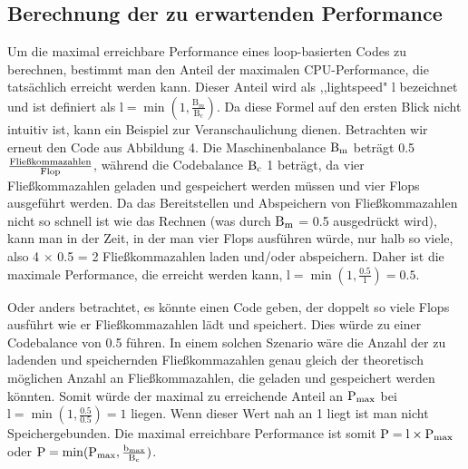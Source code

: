 \documentclass[sigconf,language=english]{acmart}
\begin{document}
    \subsection{Berechnung der zu erwartenden Performance}
    Um die maximal erreichbare Performance eines loop-basierten Codes zu berechnen, 
    bestimmt man den Anteil der maximalen CPU-Performance, die tatsächlich erreicht werden kann. 
    Dieser Anteil wird als ,,lightspeed" $\text{l}$ bezeichnet und ist definiert als 
    $\text{l} = \min(1, \frac{\text{B}_{m}}{\text{B}_{c}})$. 
    Da diese Formel auf den ersten Blick nicht intuitiv ist, 
    kann ein Beispiel zur Veranschaulichung dienen. 
    Betrachten wir erneut den Code aus Abbildung 4. 
    Die Maschinenbalance $\textnormal{B}_{\textnormal{m}}$ 
    beträgt 0.5 $\frac{\textnormal{Fließkommazahlen}}{\textnormal{Flop}}$, 
    während die Codebalance $\textnormal{B}_{\textnormal{c}}$ 1 beträgt, 
    da vier Fließkommazahlen geladen und gespeichert werden müssen und vier Flops ausgeführt werden. 
    Da das Bereitstellen und Abspeichern von Fließkommazahlen nicht so schnell ist wie das Rechnen 
    (was durch $\textnormal{B}_{\textnormal{m}}$  = 0.5 ausgedrückt wird), kann man in der Zeit, 
    in der man vier Flops ausführen würde, 
    nur halb so viele, also 4 $\times$ 0.5 = 2 Fließkommazahlen laden und/oder abspeichern.
    Daher ist die maximale Performance, die erreicht werden kann, 
    $\text{l} = \min(1, \frac{0.5}{1}) = 0.5$. 
    
    Oder anders betrachtet, es könnte einen Code geben,
    der doppelt so viele Flops ausführt wie er Fließkommazahlen lädt und speichert. 
    Dies würde zu einer Codebalance von 0.5 führen. 
    In einem solchen Szenario wäre die Anzahl 
    der zu ladenden und speichernden Fließkommazahlen genau gleich der theoretisch möglichen Anzahl
    an Fließkommazahlen, die geladen und gespeichert werden könnten. 
    Somit würde der maximal zu erreichende Anteil an 
    $\textnormal{P}_{\textnormal{max}}$ bei $\text{l} = \min(1, \frac{0.5}{0.5}) = 1$ liegen.  %
    Wenn dieser Wert nah an 1 liegt ist man nicht Speichergebunden.
    Die maximal erreichbare Performance ist somit $\textnormal{P} =  \textnormal{l} \times \textnormal{P}_{\textnormal{max}}$ oder 
    $\textnormal{P} =  \min(\textnormal{P}_{\textnormal{max}}, \frac{\textnormal{b}_{\textnormal{max}}}{\textnormal{B}_{\textnormal{c}}})$.
\end{document}
